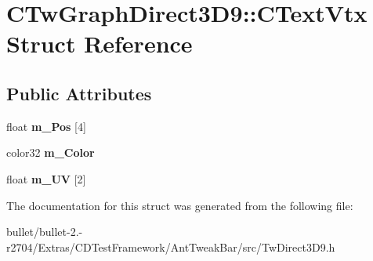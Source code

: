 \hypertarget{struct_c_tw_graph_direct3_d9_1_1_c_text_vtx}{\section{C\+Tw\+Graph\+Direct3\+D9\+:\+:C\+Text\+Vtx Struct Reference}
\label{struct_c_tw_graph_direct3_d9_1_1_c_text_vtx}
}
\subsection*{Public Attributes}
\begin{DoxyCompactItemize}
\item 
\hypertarget{struct_c_tw_graph_direct3_d9_1_1_c_text_vtx_a923d097ef36cd20da2d8b481b22c7900}{float {\bfseries m\+\_\+\+Pos} \mbox{[}4\mbox{]}}\label{struct_c_tw_graph_direct3_d9_1_1_c_text_vtx_a923d097ef36cd20da2d8b481b22c7900}

\item 
\hypertarget{struct_c_tw_graph_direct3_d9_1_1_c_text_vtx_a8e036c48b2a5dec5af54401ad87140db}{color32 {\bfseries m\+\_\+\+Color}}\label{struct_c_tw_graph_direct3_d9_1_1_c_text_vtx_a8e036c48b2a5dec5af54401ad87140db}

\item 
\hypertarget{struct_c_tw_graph_direct3_d9_1_1_c_text_vtx_a4051d164beb2a03bd5e6f0e74ec57c40}{float {\bfseries m\+\_\+\+U\+V} \mbox{[}2\mbox{]}}\label{struct_c_tw_graph_direct3_d9_1_1_c_text_vtx_a4051d164beb2a03bd5e6f0e74ec57c40}

\end{DoxyCompactItemize}


The documentation for this struct was generated from the following file\+:\begin{DoxyCompactItemize}
\item 
bullet/bullet-\/2.-\/r2704/\+Extras/\+C\+D\+Test\+Framework/\+Ant\+Tweak\+Bar/src/Tw\+Direct3\+D9.\+h\end{DoxyCompactItemize}
